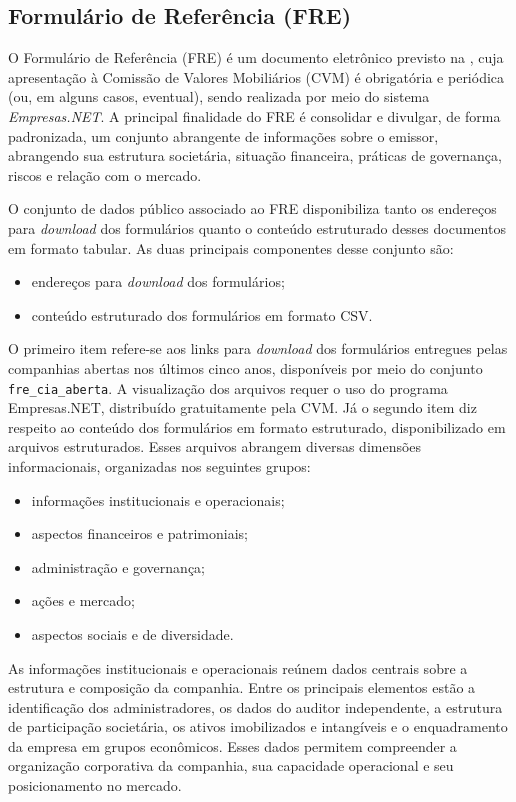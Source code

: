 \documentclass[recuosum=1.5cm]{iftex2024}
\begin{document}
\subsection{Formulário de Referência (FRE)}

O Formulário de Referência (FRE) é um documento eletrônico previsto na \citet{cvm:2022:resolucao}, cuja apresentação à Comissão de Valores Mobiliários (CVM) é obrigatória e periódica (ou, em alguns casos, eventual), sendo realizada por meio do sistema \textit{Empresas.NET}. A principal finalidade do FRE é consolidar e divulgar, de forma padronizada, um conjunto abrangente de informações sobre o emissor, abrangendo sua estrutura societária, situação financeira, práticas de governança, riscos e relação com o mercado.

O conjunto de dados público associado ao FRE disponibiliza tanto os endereços para \textit{download} dos formulários quanto o conteúdo estruturado desses documentos em formato tabular. As duas principais componentes desse conjunto são:

\begin{itemize}
	\item endereços para \textit{download} dos formulários;
	\item conteúdo estruturado dos formulários em formato CSV.
\end{itemize}

O primeiro item refere-se aos links para \textit{download} dos formulários entregues pelas companhias abertas nos últimos cinco anos, disponíveis por meio do conjunto \texttt{fre\_cia\_aberta}. A visualização dos arquivos requer o uso do programa Empresas.NET, distribuído gratuitamente pela CVM. Já o segundo item diz respeito ao conteúdo dos formulários em formato estruturado, disponibilizado em arquivos estruturados. Esses arquivos abrangem diversas dimensões informacionais, organizadas nos seguintes grupos:

\begin{itemize}
	\item informações institucionais e operacionais;
	\item aspectos financeiros e patrimoniais;
	\item administração e governança;
	\item ações e mercado;
	\item aspectos sociais e de diversidade.
\end{itemize}

As informações institucionais e operacionais reúnem dados centrais sobre a estrutura e composição da companhia. Entre os principais elementos estão a identificação dos administradores, os dados do auditor independente, a estrutura de participação societária, os ativos imobilizados e intangíveis e o enquadramento da empresa em grupos econômicos. Esses dados permitem compreender a organização corporativa da companhia, sua capacidade operacional e seu posicionamento no mercado.
\end{document}
